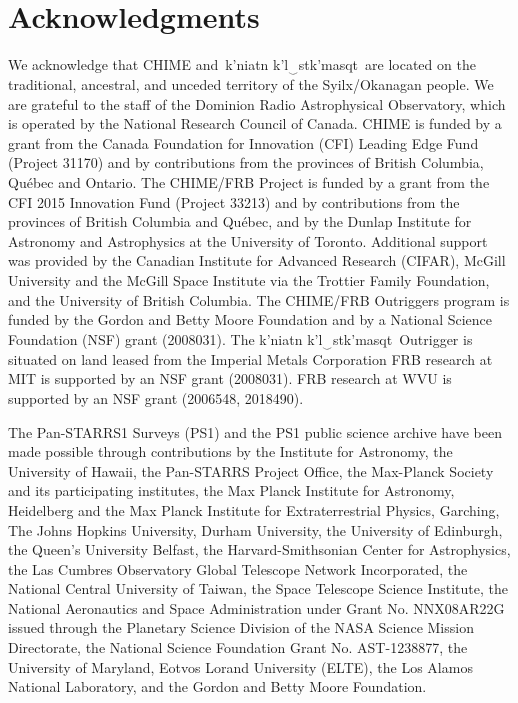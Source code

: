 \documentclass[twocolumn]{aastex631}
\newcommand{\kkoname}{k'ni\textipa{P}atn k'l$\left._\mathrm{\smile}\right.$stk'masqt}
\begin{document}
\section{Acknowledgments}
We acknowledge that CHIME and~\kkoname\ are located on the traditional, 
ancestral, and unceded territory of the Syilx/Okanagan people. We are grateful to the staff of the Dominion Radio
Astrophysical Observatory, which is operated by the National Research Council of Canada. 
CHIME is funded by a grant from the Canada Foundation 
for Innovation (CFI) Leading Edge Fund (Project 31170) 
and by contributions from the provinces of British Columbia, 
Qu\'ebec and Ontario. The CHIME/FRB Project is funded by a 
grant from the CFI 2015 Innovation Fund (Project 33213) and 
by contributions from the provinces of British Columbia and 
Qu\'ebec, and by the Dunlap Institute for Astronomy and 
Astrophysics at the University of Toronto. 
Additional support was provided by the Canadian 
Institute for Advanced Research (CIFAR), McGill 
University and the McGill Space Institute via the 
Trottier Family Foundation, and the University of 
British Columbia. 
The CHIME/FRB Outriggers program is funded by 
the Gordon and Betty Moore Foundation and by a National Science Foundation (NSF) grant (2008031).
The \kkoname~Outrigger is situated on land leased from the Imperial Metals Corporation
FRB research at MIT is supported by an NSF grant (2008031).
FRB research at WVU is supported by an NSF grant (2006548, 2018490).

The Pan-STARRS1 Surveys (PS1) and the PS1 public science archive have been made possible through contributions by the Institute for Astronomy, the University of Hawaii, the Pan-STARRS Project Office, the Max-Planck Society and its participating institutes, the Max Planck Institute for Astronomy, Heidelberg and the Max Planck Institute for Extraterrestrial Physics, Garching, The Johns Hopkins University, Durham University, the University of Edinburgh, the Queen's University Belfast, the Harvard-Smithsonian Center for Astrophysics, the Las Cumbres Observatory Global Telescope Network Incorporated, the National Central University of Taiwan, the Space Telescope Science Institute, the National Aeronautics and Space Administration under Grant No. NNX08AR22G issued through the Planetary Science Division of the NASA Science Mission Directorate, the National Science Foundation Grant No. AST-1238877, the University of Maryland, Eotvos Lorand University (ELTE), the Los Alamos National Laboratory, and the Gordon and Betty Moore Foundation.
\end{document}
